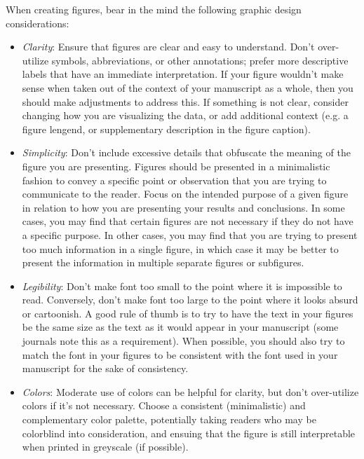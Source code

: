 \documentclass[12pt,a4paper,article,oneside]{memoir} %
\begin{document}
When creating figures, bear in the mind the following graphic design considerations:
\begin{itemize}
\item \textit{Clarity}: Ensure that figures are clear and easy to understand. Don't over-utilize symbols, abbreviations, or other annotations; prefer more descriptive labels that have an immediate interpretation. If your figure wouldn't make sense when taken out of the context of your manuscript as a whole, then you should make adjustments to address this. If something is not clear, consider changing how you are visualizing the data, or add additional context (e.g. a figure lengend, or supplementary description in the figure caption).
\item \textit{Simplicity}: Don't include excessive details that obfuscate the meaning of the figure you are presenting. Figures should be presented in a minimalistic fashion to convey a specific point or observation that you are trying to communicate to the reader. Focus on the intended purpose of a given figure in relation to how you are presenting your results and conclusions. In some cases, you may find that certain figures are not necessary if they do not have a specific purpose. In other cases, you may find that you are trying to present too much information in a single figure, in which case it may be better to present the information in multiple separate figures or subfigures.
\item \textit{Legibility}: Don't make font too small to the point where it is impossible to read. Conversely, don't make font too large to the point where it looks absurd or cartoonish. A good rule of thumb is to try to have the text in your figures be the same size as the text as it would appear in your manuscript (some journals note this as a requirement). When possible, you should also try to match the font in your figures to be consistent with the font used in your manuscript for the sake of consistency.
\item \textit{Colors}: Moderate use of colors can be helpful for clarity, but don't over-utilize colors if it's not necessary. Choose a consistent (minimalistic) and complementary color palette, potentially taking readers who may be colorblind into consideration, and ensuing that the figure is still interpretable when printed in greyscale (if possible).
\end{itemize}

\end{document}
